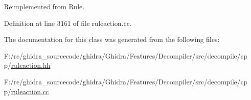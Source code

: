 Reimplemented from \mbox{\hyperlink{class_rule_a4023bfc7825de0ab866790551856d10e}{Rule}}.



Definition at line 3161 of file ruleaction.\+cc.



The documentation for this class was generated from the following files\+:\begin{DoxyCompactItemize}
\item 
F\+:/re/ghidra\+\_\+sourcecode/ghidra/\+Ghidra/\+Features/\+Decompiler/src/decompile/cpp/\mbox{\hyperlink{ruleaction_8hh}{ruleaction.\+hh}}\item 
F\+:/re/ghidra\+\_\+sourcecode/ghidra/\+Ghidra/\+Features/\+Decompiler/src/decompile/cpp/\mbox{\hyperlink{ruleaction_8cc}{ruleaction.\+cc}}\end{DoxyCompactItemize}
